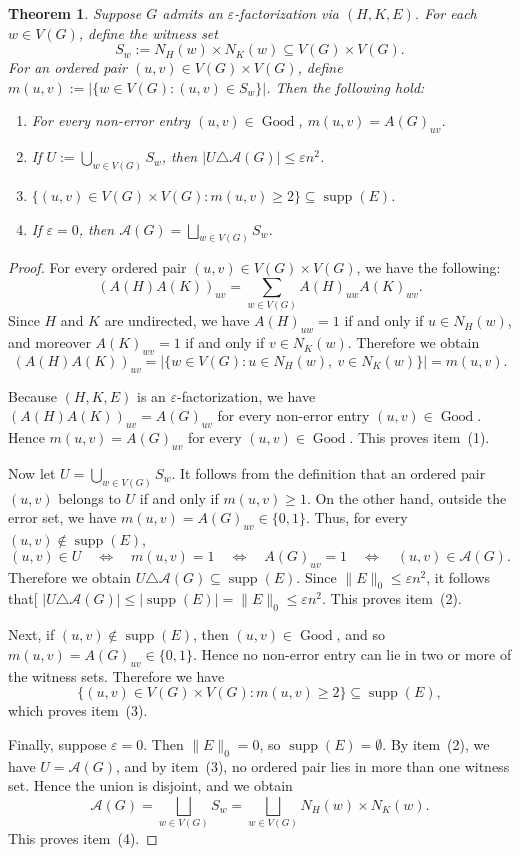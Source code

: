 \documentclass[10pt,a4paper]{amsart}
\newtheorem{thm}{Theorem}
\newcommand{\Good}{\operatorname{Good}}
\newcommand{\eps}{\varepsilon}
\newcommand{\supp}{\operatorname{supp}}
\begin{document}
\begin{thm}
\label{thm:biclique-localized}
Suppose $G$ admits an $\eps$-factorization via $(H,K,E)$.  For each $w\in V(G)$, define the witness set
\[
  S_w:=N_H(w)\times N_K(w)\subseteq V(G)\times V(G).
\]
For an ordered pair $(u,v)\in V(G)\times V(G)$, define
$m(u,v):= |\{w\in V(G):(u,v)\in S_w\}|$.
Then the following hold:
\begin{enumerate}
  \item For every non-error entry $(u,v)\in\Good$, $m(u,v)=A(G)_{uv}$.
  \item If $U:=\bigcup_{w\in V(G)} S_w$,
  then $|U\triangle \mathcal A(G)|\le \eps n^2$.

  \item $\{(u,v)\in V(G)\times V(G):m(u,v)\ge 2\}\subseteq \supp(E)$.
  \item If $\eps=0$, then $\mathcal A(G)=\bigsqcup_{w\in V(G)} S_w$.
\end{enumerate}
\end{thm}

\begin{proof}
For every ordered pair $(u,v)\in V(G)\times V(G)$, we have the following:
\[
  (A(H)A(K))_{uv}
  =
  \sum_{w\in V(G)} A(H)_{uw}A(K)_{wv}.
\]
Since $H$ and $K$ are undirected,
we have $A(H)_{uw}=1$ if and only if $u\in N_H(w)$,
and moreover  $A(K)_{wv}=1$ if and only if $v\in N_K(w)$.
Therefore we obtain
\[
  (A(H)A(K))_{uv}
  =
  |\{w\in V(G):u\in N_H(w),\ v\in N_K(w)\}|
  =
  m(u,v).
\]

Because $(H,K,E)$ is an $\eps$-factorization, we have
$(A(H)A(K))_{uv}=A(G)_{uv}$ for every non-error entry $(u,v)\in\Good$.  
Hence $m(u,v)=A(G)_{uv}$ for every $(u,v)\in\Good$.  
This proves item~(1).

Now let $U=\bigcup_{w\in V(G)} S_w$.
It follows from the definition that an ordered pair $(u,v)$ belongs to $U$ if and only if $m(u,v)\ge 1$.  
On the other hand, outside the error set, we have
$m(u,v)=A(G)_{uv}\in\{0,1\}$.
Thus, for every $(u,v)\notin\supp(E)$,
\[
  (u,v)\in U
  \quad\Longleftrightarrow\quad
  m(u,v)=1
  \quad\Longleftrightarrow\quad
  A(G)_{uv}=1
  \quad\Longleftrightarrow\quad
  (u,v)\in\mathcal A(G).
\]
Therefore we obtain $U\triangle \mathcal A(G)\subseteq \supp(E)$.
Since $\|E\|_0\le \eps n^2$, it follows that[
$|U\triangle \mathcal A(G)|
  \le
  |\supp(E)|
  =
  \|E\|_0
  \le
  \eps n^2$.
This proves item~(2).

Next, if $(u,v)\notin\supp(E)$, then $(u,v)\in\Good$, and so $m(u,v)=A(G)_{uv}\in\{0,1\}$.
Hence no non-error entry can lie in two or more of the witness sets.  
Therefore we have 
\[
  \{(u,v)\in V(G)\times V(G):m(u,v)\ge 2\}\subseteq \supp(E),
\]
which proves item~(3).

Finally, suppose $\eps=0$.  Then $\|E\|_0=0$, so $\supp(E)=\emptyset$.  By
item~(2), we have $U=\mathcal A(G)$, and by item~(3), no ordered pair lies in more than one witness set.  
Hence the union is disjoint, and we obtain
\[
  \mathcal A(G)
  =
  \bigsqcup_{w\in V(G)} S_w
  =
  \bigsqcup_{w\in V(G)} N_H(w)\times N_K(w).
\]
This proves item~(4).
\end{proof}
\end{document}

